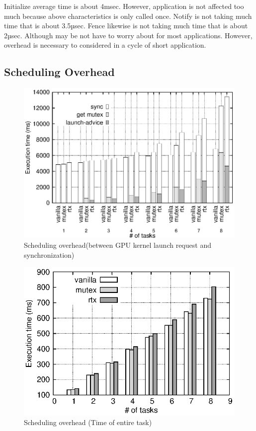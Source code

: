 Initialize average time is about 4msec.
However, application is not affected too much because above characteristics is only called once.
Notify is not taking much time that is about 3.5µsec.
Fence likewise is not taking much time that is about 2µsec.
Although may be not have to worry about for most applications.
However, overhead is necessary to considered in a cycle of short application.


\subsection{Scheduling Overhead}\label{sec:eval:sched_overhead}

\begin{figure}[t]
\begin{center}
\includegraphics[width=1.5\textwidth]{img/sum_task_fp.eps}
\caption{Scheduling overhead(between GPU kernel launch request and synchronization)}
\label{fig:fp_overhead}
\end{center}
\end{figure}
\fi

\begin{figure}[t]
\begin{center}
\includegraphics[width=.44\textwidth]{img/sum_task.eps}
\caption{Scheduling overhead (Time of entire task)}
\label{fig:fp_task_overhead}
\end{center}
\end{figure}

